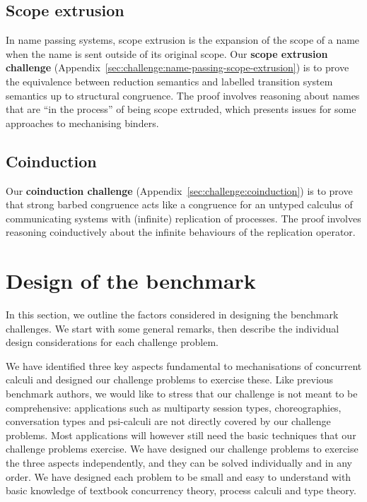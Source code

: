 \documentclass[runningheads]{llncs}
\begin{document}
\subsection{Scope extrusion}
In name passing systems, scope extrusion is the expansion of the scope of a name when the name is sent outside of its original scope.
Our \textbf{scope extrusion challenge} (Appendix~\ref{sec:challenge:name-passing-scope-extrusion}) is to prove the equivalence between reduction semantics and labelled transition system semantics up to structural congruence.
The proof involves reasoning about names that are ``in the process'' of being scope extruded, which presents issues for some approaches to mechanising binders.

\subsection{Coinduction}
Our \textbf{coinduction challenge} (Appendix~\ref{sec:challenge:coinduction}) is to prove that strong barbed congruence acts like a congruence for an untyped calculus of communicating systems with (infinite) replication of processes.
The proof involves reasoning coinductively about the infinite behaviours of the replication operator.

\section{Design of the benchmark}\label{sec:design-discussion}
In this section, we outline the factors considered in designing the
benchmark challenges. We start with some general remarks, then
describe the individual design considerations for each challenge
problem.

We have identified three key aspects fundamental to mechanisations of concurrent calculi and designed our challenge problems to exercise these.
Like previous benchmark authors, we would like to stress that our challenge is not meant to be comprehensive: applications such as multiparty session types, choreographies, conversation types and psi-calculi are not directly covered by our challenge problems.
Most applications will however still need the basic techniques that our challenge problems exercise.
We have designed our challenge problems to exercise the three aspects independently, and they can be solved individually and in any order.
We have designed each problem to be small and easy to understand with basic knowledge of textbook concurrency theory, process calculi and type theory.
\end{document}
